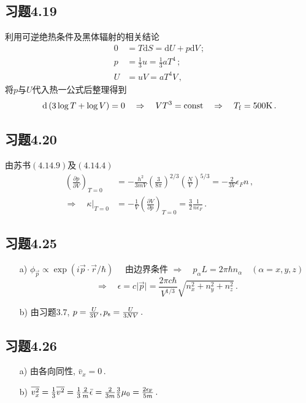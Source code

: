 \documentclass[letterpaper, 10pt]{article}
\newcommand{\dd}{\mathrm{d}}
\begin{document}
\subsection{习题4.19}
利用可逆绝热条件及黑体辐射的相关结论
\begin{align*}
0 & =  T \dd S = \dd U + p\dd V \,; \\
p & = \frac{1}{3} u = \frac{1}{3} a T^{4} \,; \\
U & = uV = a T^{4} V \,,
\end{align*}
将$p$与$U$代入热一公式后整理得到
\[ \dd \left( 3 \log{T} + \log{V} \right) = 0 \quad{} \Rightarrow \quad{} VT^{3} = {\rm const} \quad{} \Rightarrow \quad{} T_{\rm f} = 500 {\rm K}\,. \]

\subsection{习题4.20}
由苏书$(4.14.9)$及$(4.14.4)$
\begin{align*}
\left( \frac{\partial p}{\partial V} \right)_{T=0} & = - \frac{h^{2}}{3mV} \left( \frac{3}{8\pi} \right)^{2/3} \left( \frac{N}{V} \right)^{5/3} = - \frac{2}{3V} \epsilon_{F} n \,, \\
\Rightarrow \quad{} \kappa\rvert_{T=0} & = - \frac{1}{V} \left( \frac{\partial V}{\partial p} \right)_{T=0} = \frac{3}{2} \frac{1}{n\epsilon_{F}}\,.
\end{align*}

\subsection{习题4.25}
\begin{itemize}
	\item[a)]
	$\phi_{\vec{p}} \propto \exp{(i \vec{p} \cdot \vec{r} / \hbar)} \quad{}$ 由边界条件 $\Rightarrow \quad{} p_{\alpha} L = 2\pi\hbar n_{\alpha}\quad{} (\alpha = x, y, z)$
	\[ \Rightarrow \quad{} \epsilon = c\lvert{\vec{p}}\rvert = \frac{2\pi c\hbar}{V^{1/3}} \sqrt{n_{x}^{2}+n_{y}^{2}+n_{z}^{2}}\,. \]
	\item[b)]
	由习题$3.7$, $p=\frac{U}{3V}, p_{\rm s}=\frac{U}{3NV}\,.$
\end{itemize}

\subsection{习题4.26}
\begin{itemize}
	\item[a)]
	由各向同性, $\bar{v}_{x} = 0\,.$
	\item[b)]
	$\overline{v_{x}^{2}} = \frac{1}{3} \overline{v^{2}} = \frac{1}{3} \frac{2}{m} \bar{\epsilon} = \frac{2}{3m} \frac{3}{5} \mu_{0} = \frac{2\epsilon_{\rm F}}{5m}\,.$
\end{itemize}
\end{document}
